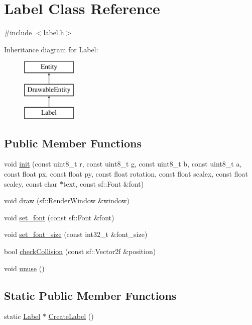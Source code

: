 \hypertarget{class_label}{}\section{Label Class Reference}
\label{class_label}


{\ttfamily \#include $<$label.\+h$>$}

Inheritance diagram for Label\+:\begin{figure}[H]
\begin{center}
\leavevmode
\includegraphics[height=3.000000cm]{class_label}
\end{center}
\end{figure}
\subsection*{Public Member Functions}
\begin{DoxyCompactItemize}
\item 
void \hyperlink{class_label_ab69dd0268124ac21d55b87734fd282a0}{init} (const uint8\+\_\+t r, const uint8\+\_\+t g, const uint8\+\_\+t b, const uint8\+\_\+t a, const float px, const float py, const float rotation, const float scalex, const float scaley, const char $\ast$text, const sf\+::\+Font \&font)
\item 
void \hyperlink{class_label_acaf5dfeeab3e46b5795b8cd24c9d94fe}{draw} (sf\+::\+Render\+Window \&window)
\item 
void \hyperlink{class_label_affe136b0a2e4a2240ecd30460222811d}{set\+\_\+font} (const sf\+::\+Font \&font)
\item 
void \hyperlink{class_label_a9e794358a782f0a4ba163bcbbe013612}{set\+\_\+font\+\_\+size} (const int32\+\_\+t \&font\+\_\+size)
\item 
bool \hyperlink{class_label_ad79f141fe2f04fd095b9507cac2667a6}{check\+Collision} (const sf\+::\+Vector2f \&position)
\item 
void \hyperlink{class_label_abafe12b2237df6f7e915d407d8084ec7}{unuse} ()
\end{DoxyCompactItemize}
\subsection*{Static Public Member Functions}
\begin{DoxyCompactItemize}
\item 
static \hyperlink{class_label}{Label} $\ast$ \hyperlink{class_label_a9331db7ea12bb0bfa69910b9aa2229a4}{Create\+Label} ()
\end{DoxyCompactItemize}
